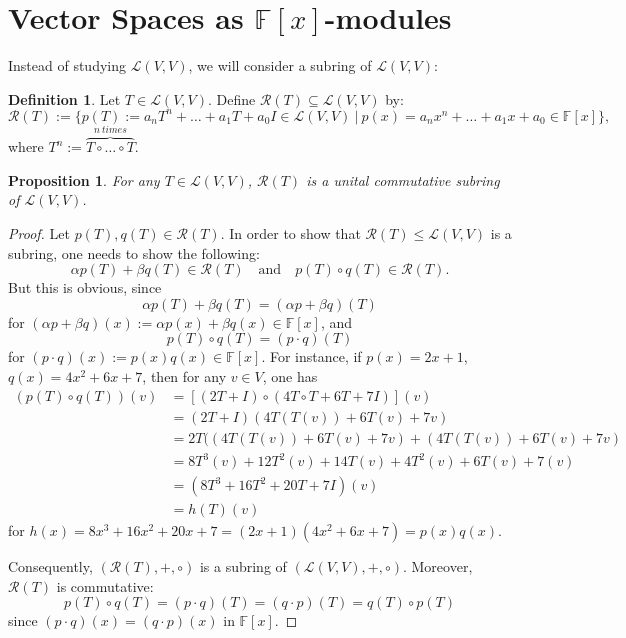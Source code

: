 \documentclass[11pt,openany]{book}
\theoremstyle{plain}
\newtheorem{proposition}[proposition]{Proposition}
\theoremstyle{definition}
\newtheorem{definition}[definition]{Definition}
\theoremstyle{remark}
\begin{document}
\section{Vector Spaces as $\mathbb{F}[x]$-modules}
Instead of studying $\mathcal{L}(V,V)$, we will consider a subring of $\mathcal{L}(V,V)$:
\begin{definition}
    Let $T \in \mathcal{L}(V,V)$. Define $\mathcal{R}(T) \subseteq \mathcal{L}(V,V)$ by:
$$\mathcal{R}(T) := \{ p(T) := a_n T^n + \dots + a_1 T + a_0 I \in \mathcal{L}(V,V)\ |\ p(x) = a_n x^n + \dots + a_1 x + a_0 \in \mathbb{F}[x]\},$$
where $T^n := \overbrace{T \circ \dots \circ T}^{n\ times}$.
\end{definition}

\begin{proposition} \label{prop-subring}
    For any $T \in \mathcal{L}(V,V)$, $\mathcal{R}(T)$ is a unital commutative subring of $\mathcal{L}(V,V)$.
\end{proposition}
\begin{proof}
    Let $p(T), q(T) \in \mathcal{R}(T)$. In order to show that $\mathcal{R}(T) \leq \mathcal{L}(V,V)$ is a subring, one needs to show the following:
    $$\alpha p(T) + \beta q(T) \in \mathcal{R}(T) \quad \text{and} \quad p(T) \circ q(T) \in \mathcal{R}(T).$$
    But this is obvious, since 
    $$\alpha p(T) + \beta q(T) = (\alpha p + \beta q)(T)$$
    for $(\alpha p + \beta q)(x) := \alpha p(x) + \beta q(x) \in \mathbb{F}[x]$, and
    $$p(T) \circ q(T) = (p \cdot q)(T)$$
    for $(p \cdot q)(x) := p(x)q(x) \in \mathbb{F}[x]$. For instance, if $p(x) = 2x + 1$, $q(x) = 4x^2 + 6x + 7$, then for any $v \in V$, one has
    \begin{align*}
    (p(T) \circ q(T))(v) &= [(2T + I) \circ (4 T\circ T + 6 T + 7I)](v) \\
    &= (2T+I)(4T(T(v)) + 6T(v) + 7v)\\
    &= 2T((4T(T(v)) + 6T(v) + 7v) + (4T(T(v)) + 6T(v) + 7v)\\
    &= 8T^3(v) + 12T^2(v) + 14T(v) + 4T^2(v) + 6T(v) + 7(v)\\
    &= (8T^3 + 16T^2 + 20T + 7I)(v)\\
    &= h(T)(v)
    \end{align*}
    for $h(x) = 8x^3 + 16x^2 + 20x + 7 = (2x+1)(4x^2 + 6x+7) = p(x)q(x)$.

    Consequently, $(\mathcal{R}(T), +, \circ)$ is a subring of $(\mathcal{L}(V,V), +, \circ)$. Moreover, $\mathcal{R}(T)$ is commutative:
    $$p(T) \circ q(T) = (p\cdot q)(T) = (q \cdot p)(T) = q(T) \circ p(T)$$
    since $(p \cdot q)(x) = (q \cdot p)(x)$ in $\mathbb{F}[x]$.
\end{proof}
\end{document}
